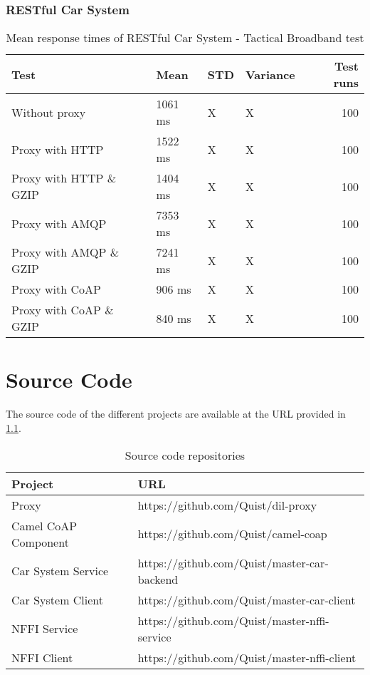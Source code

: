 \begin{appendices}
\subsection{RESTful Car System}

\begin{table}[H]
\begin{tabular}{llllr}
\hline
 Test                   &   Mean &   STD  &   Variance &   Test runs \\
\hline
  Without proxy & 1061 ms & X & X & 100 \\
  Proxy with HTTP & 1522 ms & X & X & 100 \\
  Proxy with HTTP \& GZIP & 1404 ms & X & X & 100 \\
  Proxy with AMQP & 7353 ms & X & X & 100 \\
  Proxy with AMQP \& GZIP & 7241 ms & X & X & 100\\
  Proxy with CoAP & 906 ms & X & X & 100 \\
  Proxy with CoAP \& GZIP & 840 ms & X & X & 100 \\
\end{tabular}
\caption{Mean response times of RESTful Car System - Tactical Broadband test}
\end{table}

\chapter{Source Code}
\label{appendix-source-code}

The source code of the different projects are available at the URL provided in
\cref{ab}.

\begin{table}[H]
\centering
\begin{tabular}{|l|l|}
\hline
\textbf{Project}     & \textbf{URL}                                 \\ \hline
Proxy                & https://github.com/Quist/dil-proxy           \\ \hline
Camel CoAP Component & https://github.com/Quist/camel-coap          \\ \hline
Car System Service   & https://github.com/Quist/master-car-backend  \\ \hline
Car System Client    & https://github.com/Quist/master-car-client   \\ \hline
NFFI Service         & https://github.com/Quist/master-nffi-service \\ \hline
NFFI Client          & https://github.com/Quist/master-nffi-client  \\ \hline
\end{tabular}
\caption{Source code repositories}
\label{ab}
\end{table}


\end{appendices}
